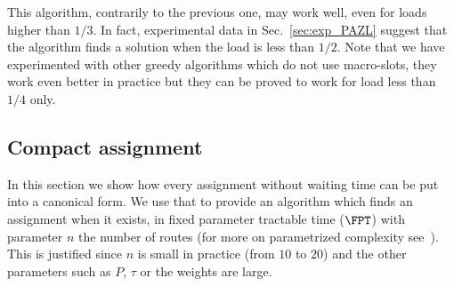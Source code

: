 \documentclass[a4paper,10pt]{article}
\begin{document}
% 
% 
% 
	
This algorithm, contrarily to the previous one, may work well, even for loads higher than $1/3$.
In fact, experimental data in Sec.~\ref{sec:exp_PAZL} suggest that the algorithm finds a solution when the load is less than $1/2$. Note that we have experimented with other greedy algorithms which do not use macro-slots, they work even better in practice but they can be proved to work for load less than $1/4$ only.

\subsection{Compact assignment}

In this section we show how every assignment without waiting time can be put into a canonical form.
We use that to provide an algorithm which finds an assignment when it exists, in fixed parameter tractable time ($\FPT$) with parameter $n$ the number of routes (for more on parametrized complexity see~\cite{downey2012parameterized}). This is justified since $n$ is small in practice (from $10$ to $20$) and the other parameters such as $P$, $\tau$ or the weights are large.
\end{document}
